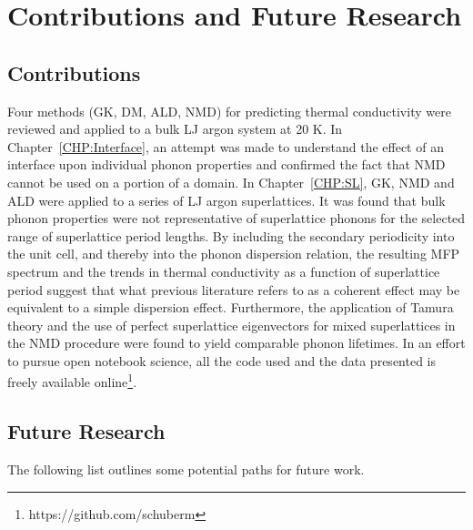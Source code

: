 \chapter{Contributions and Future Research}

\section{Contributions}

Four methods (GK, DM, ALD, NMD) for predicting thermal conductivity were reviewed and applied to a bulk LJ argon system at 20 K. In Chapter~\ref{CHP:Interface}, an attempt was made to understand the effect of an interface upon individual phonon properties and confirmed the fact that NMD cannot be used on a portion of a domain. In Chapter~\ref{CHP:SL}, GK, NMD and ALD were applied to a series of LJ argon superlattices. It was found that bulk phonon properties were not representative of superlattice phonons for the selected range of superlattice period lengths. By including the secondary periodicity into the unit cell, and thereby into the phonon dispersion relation, the resulting MFP spectrum and the trends in thermal conductivity as a function of superlattice period suggest that what previous literature refers to as a coherent effect may be equivalent to a simple dispersion effect. Furthermore, the application of Tamura theory and the use of perfect superlattice eigenvectors for mixed superlattices in the NMD procedure were found to yield comparable phonon lifetimes. In an effort to pursue open notebook science, all the code used and the data presented is freely available online\footnote{https://github.com/schuberm}.

\section{Future Research}

The following list outlines some potential paths for future work.

